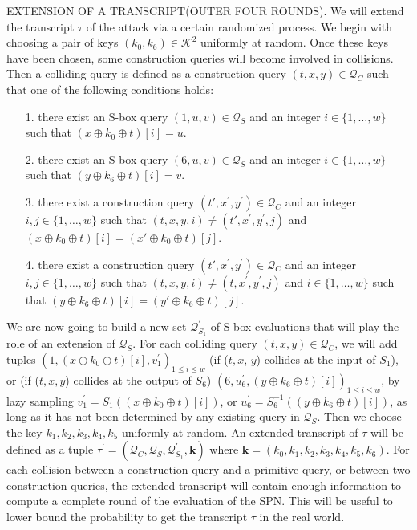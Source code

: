 \noindent
\textsc{EXTENSION OF A TRANSCRIPT(OUTER FOUR ROUNDS)}. We will extend the transcript $\tau$ of the attack via a certain randomized process. We begin with choosing a pair of keys $\left(k_{0}, k_{6}\right) \in \mathcal{K}^{2}$ uniformly at random. Once these keys have been chosen, some construction queries will become involved in collisions. Then a colliding query is defined as a construction query $(t, x, y) \in \mathcal{Q}_{C}$ such that one of the following conditions holds:

\begin{itemize}
  \item[1.]
  there exist an S-box query $(1, u, v) \in \mathcal{Q}_{S}$ and an integer $i \in\{1, \ldots, w\}$ such that $\left(x \oplus k_{0} \oplus t \right)[i]=u$.
  \item[2.]
  there exist an S-box query $(6, u, v) \in \mathcal{Q}_{S}$ and an integer $i \in\{1, \ldots, w\}$ such that $\left(y \oplus k_{6} \oplus t \right)[i]=v$.
  \item[3.]
  there exist a construction query $\left(t', x^{\prime}, y^{\prime}\right) \in \mathcal{Q}_{C}$ and an integer $i,j \in\{1, \ldots, w\}$ such that $(t, x, y, i) \neq\left(t', x^{\prime}, y^{\prime}, j\right)$ and $\left(x \oplus k_{0} \oplus t \right)[i] = \left(x' \oplus k_{0} \oplus t \right)[j]$.
  \item[4.]
  there exist a construction query $\left(t', x^{\prime}, y^{\prime}\right) \in \mathcal{Q}_{C}$ and an integer $i,j \in\{1, \ldots, w\}$ such that $(t, x, y, i) \neq\left(t, x^{\prime}, y^{\prime}, j\right)$ and $i \in\{1, \ldots, w\}$ such that $\left(y \oplus k_{6} \oplus t \right)[i] = \left(y' \oplus k_{6} \oplus t\right)[j]$.
\end{itemize}

We are now going to build a new set $\mathcal{Q}_{S_{1}}^{\prime}$ of S-box evaluations that will play the role of an extension of $\mathcal{Q}_{S}$. For each colliding query $(t, x, y) \in \mathcal{Q}_{C}$, we will add tuples $\left(1, \left(x \oplus k_{0} \oplus t\right)[i], v_1^{\prime}\right)_{1 \leq i \leq w}$ (if ($t, \mathit{x}$, $\mathit{y}$) collides at the input of $S_1$), or (if ($t, \mathit{x}, \mathit{y}$) collides at the output of $S_6$) $\left(6, u_6^{\prime}, \left(y \oplus k_{6} \oplus t\right)[i]\right)_{1 \leq i \leq w}$, by lazy sampling $v_1^{\prime}=S_{1}(\left(x \oplus k_{0} \oplus t\right)[i])$, or $u_6^{\prime}=S_{6}^{-1}(\left(y \oplus k_{6} \oplus t\right)[i])$, as long as it has not been determined by any existing query in $\mathcal{Q}_{S}$. Then we choose the key $k_1, k_2, k_3, k_4, k_5$ uniformly at random. An extended transcript of $\tau$ will be defined as a tuple $\tau^{\prime}=\left(\mathcal{Q}_{C}, \mathcal{Q}_{S}, \mathcal{Q}_{S_{1}}^{\prime}, \mathbf{k}\right)$ where $\mathbf{k}=\left(k_{0}, k_{1}, k_{2},k_{3},k_{4}, k_{5}, k_{6}\right)$. For each collision between a construction query and a primitive query, or between two construction queries, the extended transcript will contain enough information to compute a complete round of the evaluation of the SPN. This will be useful to lower bound the probability to get the transcript $\tau$ in the real world.\\

